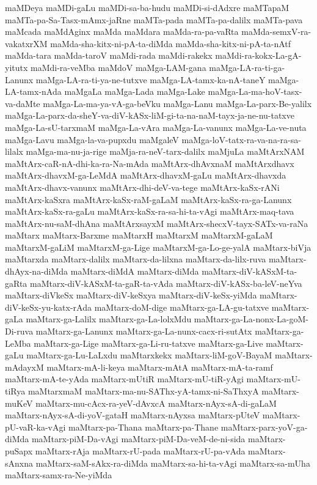 {maMDeya
maMDi-gaLu
maMDi-sa-ba-hudu
maMDi-si-dAdxre
maMTapaM
maMTa-pa-Sa-Tasx-mAmx-jaRne
maMTa-pada
maMTa-pa-dalilx
maMTa-pava
maMcada
maMdAginx
maMda
maMdara
maMda-ra-pa-vaRta
maMda-semxV-ra-vakatxrXM
maMda-sha-kitx-ni-pA-ta-diMda
maMda-sha-kitx-ni-pA-ta-nAtf
maMda-tara
maMda-taroV
maMdi-rada
maMdi-rakekx
maMdi-ra-kokx-La-gA-yitutx
maMdi-ra-veMba
maMdoV
maMga-LAM-gana
maMga-LA-ra-ti-ga-Lanunx
maMga-LA-ra-ti-ya-ne-tutxve
maMga-LA-tamx-ka-nA-taneY
maMga-LA-tamx-nAda
maMgaLa
maMga-Lada
maMga-Lake
maMga-La-ma-hoV-tasx-va-daMte
maMga-La-ma-ya-vA-ga-beVku
maMga-Lanu
maMga-La-parx-Be-yalilx
maMga-La-parx-da-sheY-va-diV-kASx-liM-gi-ta-na-naM-tayx-ja-ne-nu-tatxve
maMga-La-sU-tarxmaM
maMga-La-vAra
maMga-La-vanunx
maMga-La-ve-nuta
maMga-Lavu
maMga-la-va-pupxdu
maMgaleV
maMga-loV-tatx-ra-va-na-ra-sa-lilalx
maMga-ma-nu-ja-rige
maMja-ra-neV-tarx-dalilx
maMjuLa
maMtArxNAM
maMtArx-caR-nA-dhi-ka-ra-Na-mAda
maMtArx-dhAvxnaM
maMtArxdhavx
maMtArx-dhavxM-ga-LeMdA
maMtArx-dhavxM-gaLu
maMtArx-dhavxda
maMtArx-dhavx-vanunx
maMtArx-dhi-deV-va-tege
maMtArx-kaSx-rANi
maMtArx-kaSxra
maMtArx-kaSx-raM-gaLaM
maMtArx-kaSx-ra-ga-Lanunx
maMtArx-kaSx-ra-gaLu
maMtArx-kaSx-ra-sa-hi-ta-vAgi
maMtArx-maq-tava
maMtArx-nu-saM-dhAna
maMtArxsayxM
maMtArx-shecxV-tayx-SATx-va-raNa
maMtarx
maMtarx-Barxme
maMtarxH
maMtarxM
maMtarxM-gaLaM
maMtarxM-gaLiM
maMtarxM-ga-Lige
maMtarxM-ga-Lo-ge-yalA
maMtarx-biVja
maMtarxda
maMtarx-dalilx
maMtarx-da-lilxna
maMtarx-da-lilx-ruva
maMtarx-dhAyx-na-diMda
maMtarx-diMdA
maMtarx-diMda
maMtarx-diV-kASxM-ta-gaRta
maMtarx-diV-kASxM-ta-gaR-ta-vAda
maMtarx-diV-kASx-ba-leV-neYva
maMtarx-diVkeSx
maMtarx-diV-keSxya
maMtarx-diV-keSx-yiMda
maMtarx-diV-keSx-yu-katx-rAda
maMtarx-doM-dige
maMtarx-ga-LA-gu-tatxve
maMtarx-gaLa
maMtarx-ga-Lalilx
maMtarx-ga-La-lolxMdu
maMtarx-ga-La-nonx-La-goM-Di-ruva
maMtarx-ga-Lanunx
maMtarx-ga-La-nunx-cacx-ri-sutAtx
maMtarx-ga-LeMba
maMtarx-ga-Lige
maMtarx-ga-Li-ru-tatxve
maMtarx-ga-Live
maMtarx-gaLu
maMtarx-ga-Lu-LaLxdu
maMtarxkekx
maMtarx-liM-goV-BayaM
maMtarx-mAdayxM
maMtarx-mA-li-keya
maMtarx-mAtA
maMtarx-mA-ta-ramf
maMtarx-mA-te-yAda
maMtarx-mUtiR
maMtarx-mU-tiR-yAgi
maMtarx-mU-tiRya
maMtarxmaM
maMtarx-ma-nu-SAThx-yA-tamx-ni-SaThxyA
maMtarx-muKeV
maMtarx-mu-cAcx-ra-yeV-dAvxcA
maMtarx-nAyx-sA-di-gaLaM
maMtarx-nAyx-sA-di-yoV-gataH
maMtarx-nAyxsa
maMtarx-pUteV
maMtarx-pU-vaR-ka-vAgi
maMtarx-pa-Thana
maMtarx-pa-Thane
maMtarx-parx-yoV-ga-diMda
maMtarx-piM-Da-vAgi
maMtarx-piM-Da-veM-de-ni-sida
maMtarx-puSapx
maMtarx-rAja
maMtarx-rU-pada
maMtarx-rU-pa-vAda
maMtarx-sAnxna
maMtarx-saM-sAkx-ra-diMda
maMtarx-sa-hi-ta-vAgi
maMtarx-sa-mUha
maMtarx-samx-ra-Ne-yiMda
}
